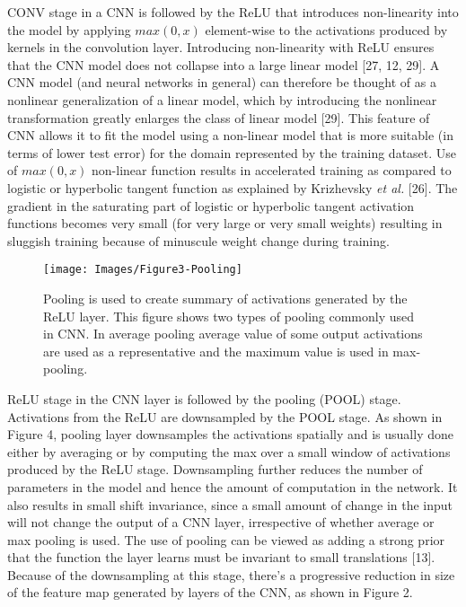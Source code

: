 \documentclass [11pt,letterpaper ,twoside ,openany ]{report}
\begin{document}
    CONV stage in a CNN is followed by the ReLU that introduces non-linearity into the model by applying \(max (0,x)\) element-wise to the activations produced by kernels in the convolution layer. Introducing non-linearity with ReLU ensures that the CNN model does not collapse into a large linear model [27, 12, 29]. A CNN model (and neural networks in general) can therefore be thought of as a nonlinear generalization of a linear model, which by introducing the nonlinear transformation greatly enlarges the class of linear model [29]. This feature of CNN allows it to fit the model using a non-linear model that is more suitable (in terms of lower test error) for the domain represented by the training dataset. Use of \(max (0,x)\) non-linear function results in accelerated training as compared to logistic or hyperbolic tangent function as explained by Krizhevsky \textit {et al.} [26]. The gradient in the saturating part of logistic or hyperbolic tangent activation functions becomes very small (for very large or very small weights) resulting in sluggish training because of minuscule weight change during training.

    \begin{wrapfigure}{r}{0.5\textwidth}
        \begin{center}
            \texttt{[image: Images/Figure3-Pooling]}
        \end{center}
        \caption{Pooling is used to create summary of activations generated by the ReLU layer. This figure shows two types of pooling commonly used in CNN. In average pooling average value of some output activations are used as a representative and the maximum value is used in max-pooling.}
    \end{wrapfigure}    

    ReLU stage in the CNN layer is followed by the pooling (POOL) stage. Activations from the ReLU are downsampled by the POOL stage. As shown in Figure 4, pooling layer downsamples the activations spatially and is usually done either by averaging or by computing the max over a small window of activations produced by the ReLU stage. Downsampling further reduces the number of parameters in the model and hence the amount of computation in the network. It also results in small shift invariance, since a small amount of change in the input will not change the output of a CNN layer, irrespective of whether average or max pooling is used. The use of pooling can be viewed as adding a strong prior that the function the layer learns must be invariant to small translations [13]. Because of the downsampling at this stage, there's a progressive reduction in size of the feature map generated by layers of the CNN, as shown in Figure 2. \\ 
\end{document}
